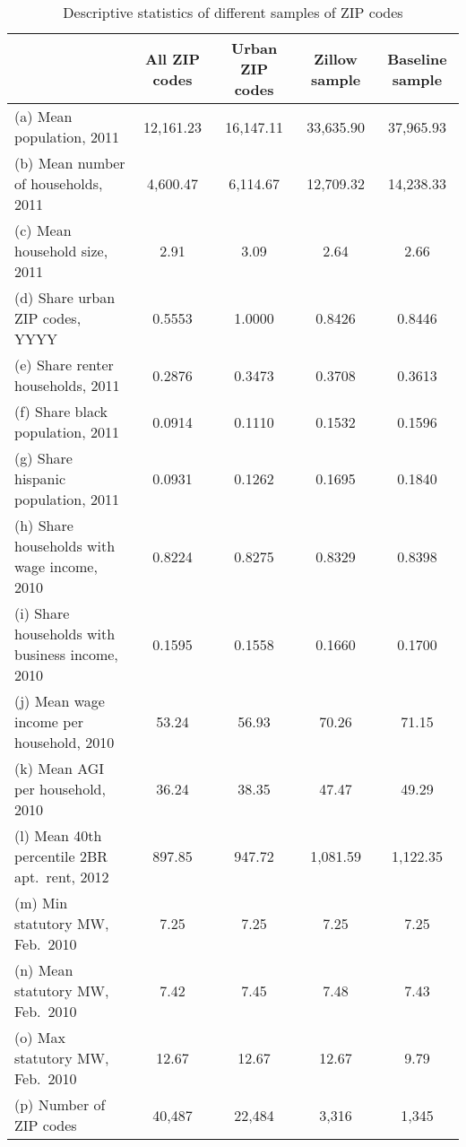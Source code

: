 \begin{table}[hbt!] \centering
    \caption{Descriptive statistics of different samples of ZIP codes}
    \label{tab:stats_zip_samples}
    \begin{tabular}{@{}lcccc@{}}
        \toprule
                                                        & \multicolumn{1}{c}{All ZIP codes} 
                                                        & \multicolumn{1}{c}{Urban ZIP codes} 
                                                        & \multicolumn{1}{c}{Zillow sample} 
                                                        & \multicolumn{1}{c}{Baseline sample}   \\ \midrule
        (a) Mean population, 2011                       & 12,161.23   & 16,147.11  & 33,635.90  & 37,965.93         \\
        (b) Mean number of households, 2011             & 4,600.47   & 6,114.67  & 12,709.32  & 14,238.33         \\
        (c) Mean household size, 2011                   & 2.91   & 3.09  & 2.64  & 2.66         \\
        (d) Share urban ZIP codes, YYYY                 & 0.5553    & 1.0000   & 0.8426   & 0.8446          \\
        (e) Share renter households, 2011               & 0.2876    & 0.3473   & 0.3708   & 0.3613          \\
        (f) Share black population, 2011                & 0.0914    & 0.1110   & 0.1532   & 0.1596          \\
        (g) Share hispanic population, 2011             & 0.0931    & 0.1262   & 0.1695   & 0.1840          \\
        (h) Share households with wage income, 2010     & 0.8224    & 0.8275   & 0.8329   & 0.8398          \\
        (i) Share households with business income, 2010 & 0.1595    & 0.1558   & 0.1660   & 0.1700          \\
        (j) Mean wage income per household, 2010        & 53.24   & 56.93  & 70.26  & 71.15         \\
        (k) Mean AGI per household, 2010                & 36.24   & 38.35  & 47.47  & 49.29         \\
        (l) Mean 40th percentile 2BR apt.\ rent, 2012   & 897.85   & 947.72  & 1,081.59  & 1,122.35         \\
        (m) Min statutory MW, Feb.\ 2010                & 7.25   & 7.25  & 7.25  & 7.25         \\
        (n) Mean statutory MW, Feb.\ 2010               & 7.42   & 7.45  & 7.48  & 7.43         \\
        (o) Max statutory MW, Feb.\ 2010                & 12.67   & 12.67  & 12.67  & 9.79         \\
        (p) Number of ZIP codes                         & 40,487   & 22,484  & 3,316  & 1,345         \\ \bottomrule
    \end{tabular}


\end{table}
